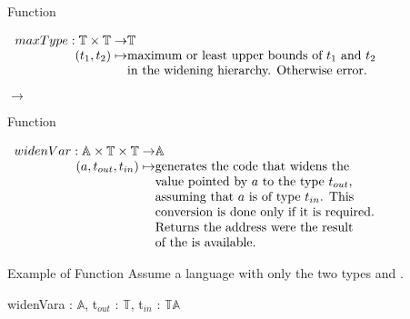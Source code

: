 \begin{bibunit}[apalike]
\begin{frame}{Function }
	\begin{definition}
		$\begin{array}{r@{}l}
			maxType : \mathbb{T} \times \mathbb{T} \rightarrow & \mathbb{T} \\
			(t_1, t_2) \mapsto & \text{maximum or least upper bounds of }t_1\text{ and }t_2 \\
			& \text{in the widening hierarchy. Otherwise error.} \\
		\end{array}$
	\end{definition}
	\begin{example}
		 $\rightarrow$ 
		\hspace{2em}
	\end{example}
\end{frame}

\begin{frame}{Function }
	\begin{definition}
		$\begin{array}{r@{}l}
			widenVar : \mathbb{A} \times \mathbb{T} \times \mathbb{T} \rightarrow & \mathbb{A} \\
			(a, t_{out}, t_{in}) \mapsto & \text{generates the code that widens the} \\
			& \text{value pointed by }a\text{ to the type }t_{out}\text{,} \\
			& \text{assuming that }a\text{ is of type }t_{in}\text{. This} \\
			& \text{conversion is done only if it is required.} \\
			& \text{Returns the address were the result} \\
			& \text{of the is available.} \\
		\end{array}$
	\end{definition}
\end{frame}

\begin{frame}{Example of Function }
	Assume a language with only the two types  and . \\
	\vspace{1em}
	\begin{myfunction}{widenVar}{a : $\mathbb{A}$, t$_{out}$ : $\mathbb{T}$, t$_{in}$ : $\mathbb{T}$}{$\mathbb{A}$}
	\end{myfunction}
\end{frame}


\end{bibunit}
